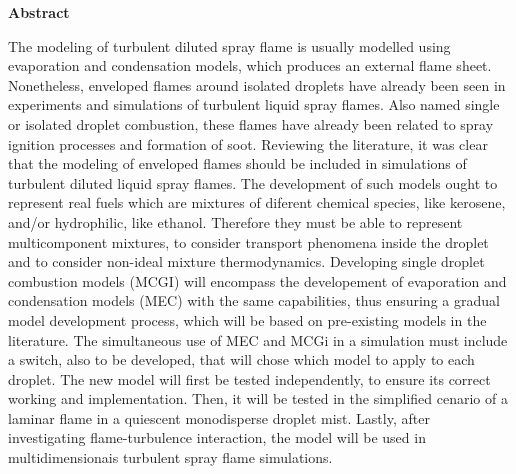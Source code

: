{ \Large \textbf{Abstract}}

\vspace{0.8cm}

{

\noindent %
The modeling of turbulent diluted spray flame is usually modelled using evaporation and condensation models, which produces an external flame sheet.
Nonetheless, enveloped flames around isolated droplets have already been seen in experiments and simulations of turbulent liquid spray flames.
Also named single or isolated droplet combustion, these flames have already been related to spray ignition processes and formation of soot.
Reviewing the literature, it was clear that the modeling of enveloped flames should be included in simulations of turbulent diluted liquid spray flames. 
The development of such models ought to represent real fuels which are mixtures of diferent chemical species, like kerosene, and/or hydrophilic, like ethanol.  
Therefore they must be able to represent multicomponent mixtures, to consider transport phenomena inside the droplet and to consider non-ideal mixture thermodynamics.
Developing single droplet combustion models (MCGI) will encompass the developement of evaporation and condensation models (MEC) with the same capabilities, thus ensuring a gradual model development process, which will be based on pre-existing models in the literature.
The simultaneous use of MEC and MCGi in a simulation must include a switch, also to be developed, that will chose which model to apply to each droplet.
The new model will first be tested independently, to ensure its correct working and implementation.
Then, it will be tested in the simplified cenario of a laminar flame in a quiescent monodisperse droplet mist.
Lastly, after investigating flame-turbulence interaction, the model will be used in multidimensionais turbulent spray flame simulations.

}